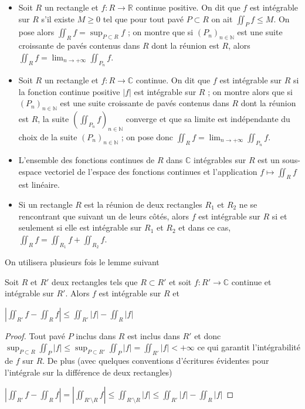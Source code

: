   \begin{itemize}
  \item Soit $R$ un rectangle et $f : R \to \mathbb{R}$ continue positive. On dit que $f$ est intégrable sur $R$ s'il existe $M \geq 0$ tel que pour tout pavé $P \subset R$ on ait $\iint_P f \leq M$. On pose alors $\iint_R f = \sup_{P \subset R} f$ ; on montre que si $(P_n)_{n \in \mathbb{N}}$ est une suite croissante de pavés contenus dans $R$ dont la réunion est $R$, alors $\iint_R f = \lim_{n \to +\infty} \iint_{P_n} f$.
  
  \item Soit $R$ un rectangle et $f : R \to \mathbb{C}$ continue. On dit que $f$ est intégrable sur $R$ si la fonction continue positive $|f|$ est intégrable sur $R$ ; on montre alors que si $(P_n)_{n \in \mathbb{N}}$ est une suite croissante de pavés contenus dans $R$ dont la réunion est $R$, la suite $\left(\iint_{P_n} f\right)_{n \in \mathbb{N}}$ converge et que sa limite est indépendante du choix de la suite $(P_n)_{n \in \mathbb{N}}$ ; on pose donc $\iint_R f = \lim_{n \to +\infty} \iint_{P_n} f$.
  
  \item L'ensemble des fonctions continues de $R$ dans $\mathbb{C}$ intégrables sur $R$ est un sous-espace vectoriel de l'espace des fonctions continues et l'application $f \mapsto \iint_R f$ est linéaire.
  
  \item Si un rectangle $R$ est la réunion de deux rectangles $R_1$ et $R_2$ ne se rencontrant que suivant un de leurs côtés, alors $f$ est intégrable sur $R$ si et seulement si elle est intégrable sur $R_1$ et $R_2$ et dans ce cas, $\iint_R f = \iint_{R_1} f + \iint_{R_2} f$.
  \end{itemize}
  
  On utilisera plusieurs fois le lemme suivant
  
  \begin{lem}
  Soit $R$ et $R'$ deux rectangles tels que $R \subset R'$ et soit $f : R' \to \mathbb{C}$ continue et intégrable sur $R'$. Alors $f$ est intégrable sur $R$ et
  
  $|\iint_{R'} f - \iint_R f| \leq \iint_{R'} |f| - \iint_R |f|$
  \end{lem}
  
  \begin{proof}
  Tout pavé $P$ inclus dans $R$ est inclus dans $R'$ et donc $\sup_{P \subset R} \iint_P |f| \leq \sup_{P \subset R'} \iint_P |f| = \iint_{R'} |f| < +\infty$ ce qui garantit l'intégrabilité de $f$ sur $R$. De plus (avec quelques conventions d'écritures évidentes pour l'intégrale sur la différence de deux rectangles)
  
  $|\iint_{R'} f - \iint_R f| = |\iint_{R' \setminus R} f| \leq \iint_{R' \setminus R} |f| \leq \iint_{R'} |f| - \iint_R |f|$
  \end{proof}
  
